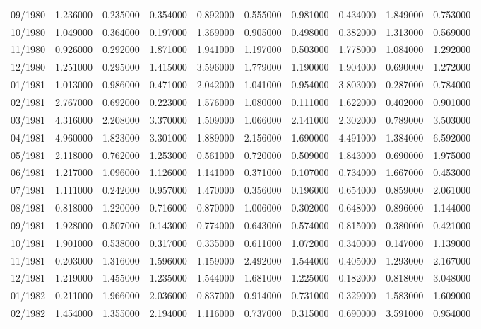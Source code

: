 \begin{tabular}{lrrrrrrrrr}
09/1980 & 1.236000 & 0.235000 & 0.354000 & 0.892000 & 0.555000 & 0.981000 & 0.434000 & 1.849000 & 0.753000 \\
10/1980 & 1.049000 & 0.364000 & 0.197000 & 1.369000 & 0.905000 & 0.498000 & 0.382000 & 1.313000 & 0.569000 \\
11/1980 & 0.926000 & 0.292000 & 1.871000 & 1.941000 & 1.197000 & 0.503000 & 1.778000 & 1.084000 & 1.292000 \\
12/1980 & 1.251000 & 0.295000 & 1.415000 & 3.596000 & 1.779000 & 1.190000 & 1.904000 & 0.690000 & 1.272000 \\
01/1981 & 1.013000 & 0.986000 & 0.471000 & 2.042000 & 1.041000 & 0.954000 & 3.803000 & 0.287000 & 0.784000 \\
02/1981 & 2.767000 & 0.692000 & 0.223000 & 1.576000 & 1.080000 & 0.111000 & 1.622000 & 0.402000 & 0.901000 \\
03/1981 & 4.316000 & 2.208000 & 3.370000 & 1.509000 & 1.066000 & 2.141000 & 2.302000 & 0.789000 & 3.503000 \\
04/1981 & 4.960000 & 1.823000 & 3.301000 & 1.889000 & 2.156000 & 1.690000 & 4.491000 & 1.384000 & 6.592000 \\
05/1981 & 2.118000 & 0.762000 & 1.253000 & 0.561000 & 0.720000 & 0.509000 & 1.843000 & 0.690000 & 1.975000 \\
06/1981 & 1.217000 & 1.096000 & 1.126000 & 1.141000 & 0.371000 & 0.107000 & 0.734000 & 1.667000 & 0.453000 \\
07/1981 & 1.111000 & 0.242000 & 0.957000 & 1.470000 & 0.356000 & 0.196000 & 0.654000 & 0.859000 & 2.061000 \\
08/1981 & 0.818000 & 1.220000 & 0.716000 & 0.870000 & 1.006000 & 0.302000 & 0.648000 & 0.896000 & 1.144000 \\
09/1981 & 1.928000 & 0.507000 & 0.143000 & 0.774000 & 0.643000 & 0.574000 & 0.815000 & 0.380000 & 0.421000 \\
10/1981 & 1.901000 & 0.538000 & 0.317000 & 0.335000 & 0.611000 & 1.072000 & 0.340000 & 0.147000 & 1.139000 \\
11/1981 & 0.203000 & 1.316000 & 1.596000 & 1.159000 & 2.492000 & 1.544000 & 0.405000 & 1.293000 & 2.167000 \\
12/1981 & 1.219000 & 1.455000 & 1.235000 & 1.544000 & 1.681000 & 1.225000 & 0.182000 & 0.818000 & 3.048000 \\
01/1982 & 0.211000 & 1.966000 & 2.036000 & 0.837000 & 0.914000 & 0.731000 & 0.329000 & 1.583000 & 1.609000 \\
02/1982 & 1.454000 & 1.355000 & 2.194000 & 1.116000 & 0.737000 & 0.315000 & 0.690000 & 3.591000 & 0.954000 \\

\end{tabular}
